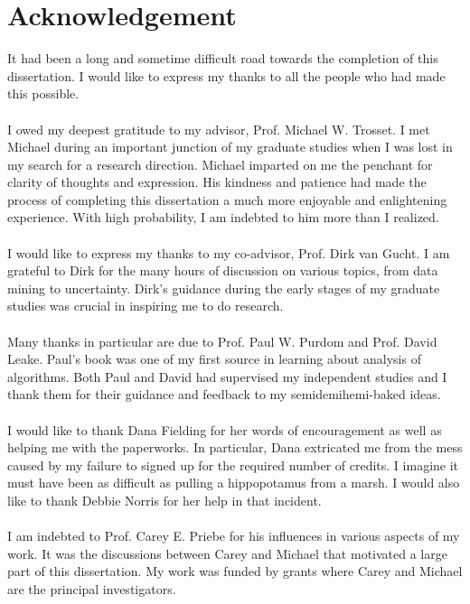 \chapter*{Acknowledgement}
It had been a long and sometime difficult road towards the completion of
this dissertation. I would like to express my thanks to all the people
who had made this possible. \\ \\
%
\noindent I owed my deepest gratitude to my advisor, Prof. Michael  W.
Trosset. I met Michael during an important junction of my graduate
studies when I was lost in my search for a research direction.  
Michael imparted on me the penchant for clarity of thoughts
and expression. His kindness and patience had made the process of
completing this dissertation a much more enjoyable and enlightening
experience. With high probability, I am indebted to him more than I
realized. \\ \\
%
\noindent I would like to express my thanks to my co-advisor, Prof. Dirk van
Gucht. I am grateful to Dirk for the many hours of discussion on
various topics, from data mining to uncertainty. Dirk's guidance
during the early stages of my graduate studies was crucial in
inspiring me to do research. \\ \\
%
\noindent Many thanks in particular are due to Prof. Paul W. Purdom
and Prof. David Leake. Paul's book was one of my first source in
learning about analysis of algorithms. Both Paul and David had
supervised my independent studies and I thank them for their guidance
and feedback to my semidemihemi-baked ideas. \\ \\
%
\noindent I would like to thank Dana Fielding for her words of encouragement as
well as helping me with the paperworks. In particular, Dana 
extricated me from the mess caused by my failure to signed up for the
required number of credits. I imagine it must have been as difficult
as pulling a hippopotamus from a marsh. I would also like to thank
Debbie Norris for her help in that incident. \\ \\
%
\noindent I am indebted to Prof. Carey E. Priebe for his influences in various
aspects of my work. It was the discussions between Carey and Michael
that motivated a large part of this dissertation. My work was funded
by grants where Carey and Michael are the principal investigators. \\
